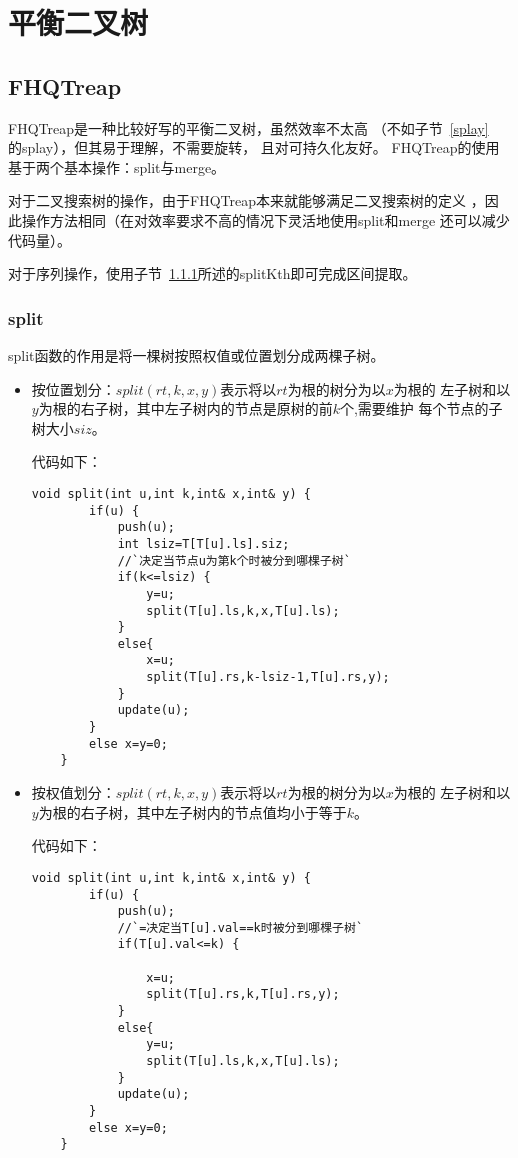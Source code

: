 \section{平衡二叉树}
\subsection{FHQTreap}\label{FHQTreap}
FHQTreap是一种比较好写的平衡二叉树，虽然效率不太高
（不如子节~\ref{splay}\\的splay），但其易于理解，不需要旋转，
且对可持久化友好。
FHQTreap的使用基于两个基本操作：split与merge。

对于二叉搜索树的操作，由于FHQTreap本来就能够满足二叉搜索树的定义
，因此操作方法相同（在对效率要求不高的情况下灵活地使用split和merge
还可以减少代码量）。

对于序列操作，使用子节~\ref{split}所述的splitKth即可完成区间提取。

\subsubsection{split}\label{split}

split函数的作用是将一棵树按照权值或位置划分成两棵子树。

\begin{itemize}
	\item
	      按位置划分：$split(rt,k,x,y)$表示将以$rt$为根的树分为以$x$为根的
	      左子树和以$y$为根的右子树，其中左子树内的节点是原树的前$k$个,需要维护
	      每个节点的子树大小$siz$。

	      代码如下：
	      \begin{lstlisting}[title=splitKth]
    void split(int u,int k,int& x,int& y) {
        if(u) {
            push(u);
            int lsiz=T[T[u].ls].siz;
            //`决定当节点u为第k个时被分到哪棵子树`
            if(k<=lsiz) {
                y=u;
                split(T[u].ls,k,x,T[u].ls);
            }
            else{
                x=u;
                split(T[u].rs,k-lsiz-1,T[u].rs,y);
            }
            update(u);
        }
        else x=y=0;
    }
\end{lstlisting}
	\item
	      按权值划分：$split(rt,k,x,y)$表示将以$rt$为根的树分为以$x$为根的
	      左子树和以$y$为根的右子树，其中左子树内的节点值均小于等于$k$。

	      代码如下：
	      \begin{lstlisting}[title=splitKey]
    void split(int u,int k,int& x,int& y) {
        if(u) {
            push(u);
            //`=决定当T[u].val==k时被分到哪棵子树`
            if(T[u].val<=k) {

                x=u;
                split(T[u].rs,k,T[u].rs,y);
            }
            else{
                y=u;
                split(T[u].ls,k,x,T[u].ls);
            }
            update(u);
        }
        else x=y=0;
    }
\end{lstlisting}
\end{itemize}

